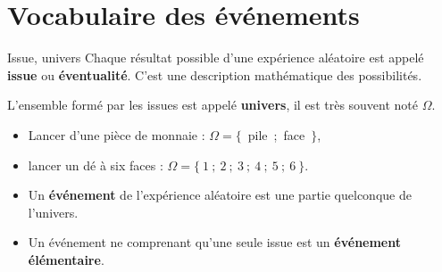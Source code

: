\documentclass[10pt,a4paper,openany,twoside, prof]{book}
\begin{document}
\entetegal{}
%

\section{Vocabulaire des événements}

\begin{defi}{Issue, univers}{}
   Chaque résultat possible d'une expérience aléatoire est appelé \textbf{issue} ou \textbf{éventualité}. C'est une description mathématique des possibilités.

   L'ensemble formé par les issues est appelé \textbf{univers}, il est très souvent noté $\Omega$.
\end{defi}

\begin{ex}{}{}
   \begin{itemize}
      \item  Lancer d'une pièce de monnaie : $\Omega =\{$~pile~;~face~$\}$,
      \item  lancer un dé à six faces : $\Omega =\{~1~;~2~;~3~;~4~;~5~;~6~\}$.
   \end{itemize}
\end{ex}

\begin{defi}{}{}
   \begin{itemize}
      \item  Un \textbf{événement} de l'expérience aléatoire est une partie quelconque de l'univers.
      \item  Un événement ne comprenant qu'une seule issue est un \textbf{événement élémentaire}.
   \end{itemize}
\end{defi}
\end{document}
